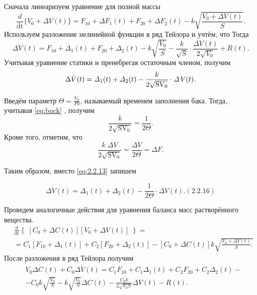 		Сначала линеаризуем уравнение для полной массы
\begin{equation*}
\frac
d{{\text{dt}}}\{V_0+\mathit{\Delta  V}(t)\}=F_{10}+\mathit{\Delta  F}_1(t)+F_{20}+\mathit{\Delta  F}_2(t)-k\sqrt{\frac{V_0+\mathit{\Delta  V}(t)}
	S}.
\end{equation*}
		Используем разложение нелинейной функции в ряд Тейлора и учтём, что
		Тогда
\begin{equation*}
\Delta \dot V(t)=F_{10}+\mathit{\Delta  }_1(t)+F_{20}+\mathit{\Delta  }_2(t)-k\sqrt{\frac{V_0} S}-\frac k{\sqrt S}\cdot
\frac{\mathit{\Delta V}(t)}{2\sqrt{V_0}}+R(t).
\end{equation*}
		Учитывая уравнение статики и пренебрегая остаточным членом, получим
\begin{equation}\label{eq:2.2.13}
		\Delta \dot V(t)=\mathit{\Delta  }_1(t)+\mathit{\Delta  }_2(t)-\frac k{2\sqrt{\normalsubformula{\text{SV}}_0}}\cdot
		\mathit{\Delta V}(t). %
\end{equation}

		 Введём параметр  $\Theta=\frac{V_{0}}{F{0}}$, называемый временем заполнения бака. Тогда, учитывая \eqref{eq:buck} %
		 , получим
\begin{equation}\label{key}
		  \frac k{2\sqrt{\text{SV}_{0}}}=\frac 1{2\Theta }.  %
\end{equation}
		Кроме того, отметим, что 
\begin{equation}\label{key}
		  \frac{k\;\mathit{\Delta V}}{2\sqrt{\text{SV}_{0}}}=\frac{\mathit{\Delta V}}{2\Theta 
		  }=\mathit{\Delta F}.  %
\end{equation}

	Таким образом, вместо \eqref{eq:2.2.13} %
	 запишем

\begin{equation}\label{eq:2_2_16}
		 \Delta \dot V(t)=\mathit{\Delta}_{1}(t)+\mathit{\Delta  }_{2}(t)-\frac {1}{2\Theta }\cdot \mathit{\Delta V}(t). (2.2.16)
\end{equation}


		Проведем аналогичные действия для уравнения баланса масс растворённого вещества. 
\begin{align*}
&\frac
d{\text{dt}}\left\{\;\left[C_0+\mathit{\Delta C}(t)\right]\left[V_0+\mathit{\Delta V}(t)\right]\;\right\}=\\
&=C_1\left[F_{10}+\mathit{\Delta  }_1(t)\right]+C_2\left[F_{20}+\mathit{\Delta  }_2(t)\right]-\left[C_0+\mathit{\Delta C}(t)\right]k\sqrt{\frac{V_0+\mathit{\Delta V}(t)}
	S.}
\end{align*}
		После разложения в ряд Тейлора получим
\begin{align*}
&V_0\Delta \dot C(t)+C_0\Delta \dot V(t)=C_1F_{10}+C_1\mathit{\Delta  }_1(t)+C_2F_{20}+C_2\mathit{\Delta}_2(t)-
\\&-C_0k\sqrt{\frac{V_0} S}-k\sqrt{\frac{V_0} S}\mathit{\Delta C}(t)-\frac{C_0k}{2\sqrt{V_0S}}\mathit{\Delta V}(t)-R(t).
\end{align*}

